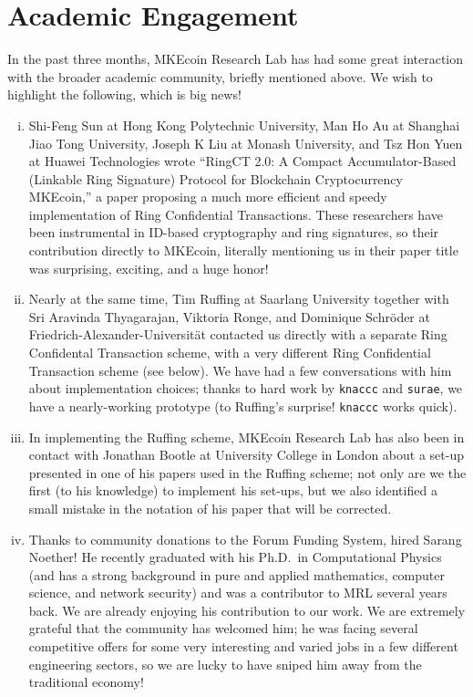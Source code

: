 \documentclass[12pt,english]{mrl}
\theoremstyle{definition}
\numberwithin{equation}{section}
\numberwithin{figure}{section}
\numberwithin{equation}{section}
\numberwithin{equation}{section}
\numberwithin{figure}{section}
\begin{document}
\section{Academic Engagement}\label{sec:academ}

In the past three months, MKEcoin Research Lab has had some great interaction with the broader academic community, briefly mentioned above. We wish to highlight the following, which is big news!

\begin{enumerate}[(i)]

\item Shi-Feng Sun at Hong Kong Polytechnic University, Man Ho Au at Shanghai Jiao Tong University, Joseph K Liu at Monash University, and Tsz Hon Yuen at Huawei Technologies wrote ``RingCT 2.0: A Compact Accumulator-Based (Linkable Ring Signature) Protocol for Blockchain Cryptocurrency MKEcoin,'' a paper proposing a much more efficient and speedy implementation of Ring Confidential Transactions. These researchers have been instrumental in ID-based cryptography and ring signatures, so their contribution directly to MKEcoin, literally mentioning us in their paper title was surprising, exciting, and a huge honor!

\item  Nearly at the same time, Tim Ruffing at Saarlang University together with Sri Aravinda Thyagarajan, Viktoria Ronge, and Dominique Schr{\"o}der at Friedrich-Alexander-Universit{\"a}t contacted us directly with a separate Ring Confidental Transaction scheme, with a very different Ring Confidential Transaction scheme (see below). We have had a few conversations with him about implementation choices; thanks to hard work by \texttt{knaccc} and \texttt{surae}, we have a nearly-working prototype (to Ruffing's surprise! \texttt{knaccc} works quick).

\item In implementing the Ruffing scheme, MKEcoin Research Lab has also been in contact with Jonathan Bootle at University College in London about a set-up presented in one of his papers used in the Ruffing scheme; not only are we the first (to his knowledge) to implement his set-ups, but we also identified a small mistake in the notation of his paper that will be corrected.

\item Thanks to community donations to the Forum Funding System, hired Sarang Noether! He recently graduated with his Ph.D.\ in Computational Physics (and has a strong background in pure and applied mathematics, computer science, and network security) and was a contributor to MRL several years back. We are already enjoying his contribution to our work. We are extremely grateful that the community has welcomed him; he was facing several competitive offers for some very interesting and varied jobs in a few different engineering sectors, so we are lucky to have sniped him away from the traditional economy!

\end{enumerate}
\end{document}
